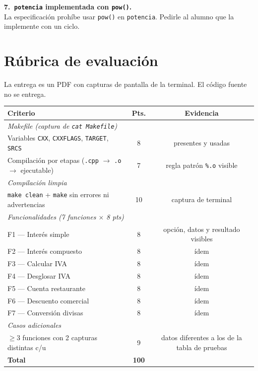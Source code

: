 \documentclass[12pt, oneside]{article}
\begin{document}
\begin{notaprofesor}
  \vspace{0.4em}
  \textbf{7.\ \texttt{potencia} implementada con \texttt{pow()}.}\\
  La especificación prohíbe usar \texttt{pow()} en \texttt{potencia}.
  Pedirle al alumno que la implemente con un ciclo.

\end{notaprofesor}

\section{Rúbrica de evaluación}

La entrega es un PDF con capturas de pantalla de la terminal.
El código fuente no se entrega.

\begin{center}
\begin{tabular}{p{8cm}cc}
  \toprule
  \textbf{Criterio} & \textbf{Pts.} & \textbf{Evidencia} \\
  \midrule
  \multicolumn{3}{l}{\textit{Makefile (captura de \texttt{cat Makefile})}} \\
  \quad Variables \texttt{CXX}, \texttt{CXXFLAGS}, \texttt{TARGET}, \texttt{SRCS}
      & 8  & presentes y usadas \\
  \quad Compilación por etapas (\texttt{.cpp} $\to$ \texttt{.o} $\to$ ejecutable)
      & 7  & regla patrón \texttt{\%.o} visible \\
  \midrule
  \multicolumn{3}{l}{\textit{Compilación limpia}} \\
  \quad \texttt{make clean} + \texttt{make} sin errores ni advertencias
      & 10 & captura de terminal \\
  \midrule
  \multicolumn{3}{l}{\textit{Funcionalidades (7 funciones $\times$ 8 pts)}} \\
  \quad F1 — Interés simple      & 8 & opción, datos y resultado visibles \\
  \quad F2 — Interés compuesto   & 8 & ídem \\
  \quad F3 — Calcular IVA        & 8 & ídem \\
  \quad F4 — Desglosar IVA       & 8 & ídem \\
  \quad F5 — Cuenta restaurante  & 8 & ídem \\
  \quad F6 — Descuento comercial & 8 & ídem \\
  \quad F7 — Conversión divisas  & 8 & ídem \\
  \midrule
  \multicolumn{3}{l}{\textit{Casos adicionales}} \\
  \quad $\geq 3$ funciones con 2 capturas distintas c/u
      & 9  & datos diferentes a los de la tabla de pruebas \\
  \midrule
  \textbf{Total} & \textbf{100} & \\
  \bottomrule
\end{tabular}
\end{center}
\end{document}
